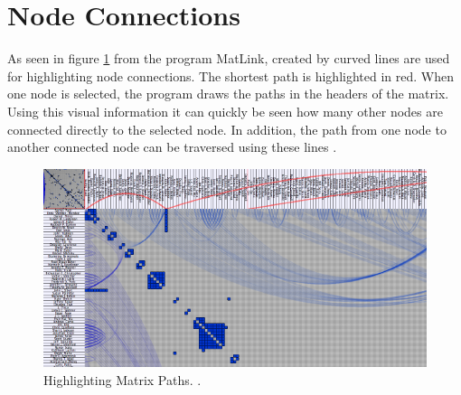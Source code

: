 \section{Node Connections}
As seen in figure \ref{fig:header_matlink} from the program MatLink, created by \citep[105-118]{henry-phd-2008} curved lines are used for highlighting node connections. The shortest path is highlighted in red. When one node is selected, the program draws the paths in the headers of the matrix. Using this visual information it can quickly be seen how many other nodes are connected directly to the selected node. In addition, the path from one node to another connected node can be traversed using these lines \citep[105-118]{henry-phd-2008}.

\begin{figure}[H]
  \includegraphics[width=\textwidth]{images/Header_MatLink_path.png}
  \caption{Highlighting Matrix Paths. \citep[105-118]{henry-phd-2008}. \label{fig:header_matlink}}
\end{figure}

